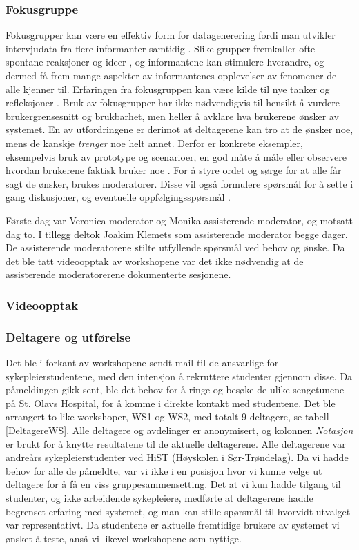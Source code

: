 \subsubsection{Fokusgruppe}
Fokusgrupper kan være en effektiv form for datagenerering fordi man utvikler intervjudata fra flere informanter samtidig \cite{Tjora}. Slike grupper fremkaller ofte spontane reaksjoner og ideer \cite{Nielsen97}, og informantene kan stimulere hverandre, og dermed få frem mange aspekter av informantenes opplevelser av fenomener de alle kjenner til. Erfaringen fra fokusgruppen kan være kilde til nye tanker og refleksjoner \cite{Tjora}. Bruk av fokusgrupper har ikke nødvendigvis til hensikt å vurdere brukergrensesnitt og brukbarhet, men heller å avklare hva brukerene ønsker av systemet. En av utfordringene er derimot at deltagerene kan tro at de ønsker noe, mens de kanskje \emph{trenger} noe helt annet. Derfor er konkrete eksempler, eksempelvis bruk av prototype og scenarioer, en god måte å måle eller observere hvordan brukerene faktisk bruker noe \cite{Nielsen97}.
For å styre ordet og sørge for at alle får sagt de ønsker, brukes moderatorer. Disse vil også formulere spørsmål for å sette i gang diskusjoner, og eventuelle oppfølgingsspørsmål \cite{Tjora}. 

\noindent
Første dag var Veronica moderator og Monika assisterende moderator, og motsatt dag to. I tillegg deltok Joakim Klemets som assisterende moderator begge dager. De assisterende moderatorene stilte utfyllende spørsmål ved behov og ønske. Da det ble tatt videoopptak av workshopene var det ikke nødvendig at de assisterende moderatorerene dokumenterte sesjonene. 

\subsubsection{Videoopptak}

\subsubsection{Deltagere og utførelse}
\label{deltagere}
Det ble i forkant av workshopene sendt mail til de ansvarlige for sykepleierstudentene, med den intensjon å rekruttere studenter gjennom disse. Da påmeldingen gikk sent, ble det behov for å ringe og besøke de ulike sengetunene på St. Olavs Hospital, for å komme i direkte kontakt med studentene. 
Det ble arrangert to like workshoper, WS1 og WS2, med totalt 9 deltagere, se tabell \ref{DeltagereWS}. Alle deltagere og avdelinger er anonymisert, og kolonnen \emph{Notasjon} er brukt for å knytte resultatene til de aktuelle deltagerene. Alle deltagerene var andreårs sykepleierstudenter ved HiST (Høyskolen i Sør-Trøndelag). Da vi hadde behov for alle de påmeldte, var vi ikke i en posisjon hvor vi kunne velge ut deltagere for å få en viss gruppesammensetting. Det at vi kun hadde tilgang til studenter, og ikke arbeidende sykepleiere, medførte at deltagerene hadde begrenset erfaring med systemet, og man kan stille spørsmål til hvorvidt utvalget var representativt. Da studentene er aktuelle fremtidige brukere av systemet vi ønsket å teste, anså vi likevel workshopene som nyttige.

